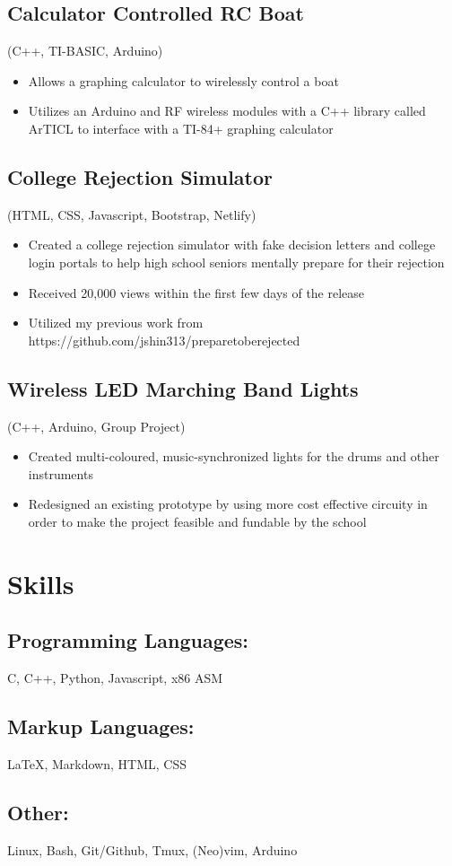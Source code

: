\documentclass{article}
\begin{document}
\subsection{Calculator Controlled RC Boat} (C++, TI-BASIC, Arduino)
\begin{itemize}
    \item Allows a graphing calculator to wirelessly control a boat
    \item Utilizes an Arduino and RF wireless modules with a C++ library called ArTICL to interface with a TI-84+ graphing calculator
\end{itemize}

\subsection{College Rejection Simulator} (HTML, CSS, Javascript, Bootstrap, Netlify)
\begin{itemize}
    \item Created a college rejection simulator with fake decision letters and college login portals to help high school seniors mentally prepare for their rejection
    \item Received 20,000 views within the first few days of the release
    \item Utilized my previous work from https://github.com/jshin313/preparetoberejected
\end{itemize}

\subsection{Wireless LED Marching Band Lights} (C++, Arduino, Group Project)
\begin{itemize}
    \item Created multi-coloured, music-synchronized lights for the drums and other instruments
    \item Redesigned an existing prototype by using more cost effective circuity in order to make the project feasible and fundable by the school
\end{itemize}

\section{Skills}
\subsection{Programming Languages:}
C, C++, Python, Javascript, x86 ASM
\subsection{Markup Languages:}
{\LaTeX}, Markdown, HTML, CSS
\subsection{Other:}
Linux, Bash, Git/Github, Tmux, (Neo)vim, Arduino
\end{document}
